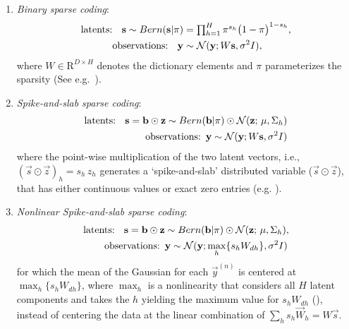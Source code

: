 \begin{enumerate}
\item \textit{Binary sparse coding}:
%
\vspace{-.1cm}
\begin{align}
\text{latents: } \,\,\,\vec{s} \sim Bern(\vec{s} | \pi) &= \disT\prod_{h=1}^H \pi^{s_h} \big( 1 - \pi \big)^{1-s_h},\nonumber \\
\text{observations:  }\,\,\,    \vec{y} &\sim \mathcal{N}(\vec{y}; W\vec{s}, \sigma^2\One),\nonumber%
\end{align}
%
where $W \in \mathrm{R}^{D \times H}$ denotes the dictionary elements and $\pi$ parameterizes the sparsity (See e.g.~\citep{HennigesEtAl2010}).
%
\item \textit{Spike-and-slab sparse coding}:
\vspace{-.2cm}
\begin{align}
\text{latents: } \,\,\,\vec{s} = \vec{b}\odot\vec{z} \sim Bern(\vec{b} | \pi) \odot \mathcal{N}(\vec{z};\,\vec{\mu} , \Sigma_h)\nonumber\\
\text{observations:}  \,\,\, \vec{y} \sim \mathcal{N}(\vec{y}; W\vec{s}, \sigma^2\One)\nonumber%
\end{align}
where the point-wise multiplication of the two latent vectors, i.e., $(\vec{s}\odot\vec{z})_h = s_h\,z_h$
generates a `spike-and-slab' distributed variable ($\vec{s}\odot\vec{z}$), that has either continuous values or exact zero entries (e.g. \citep{TitsiasGredilla2011,GoodfellowEtAl2013,SheikhEtAl2014}).
%
\item \textit{Nonlinear Spike-and-slab sparse coding}:
\vspace{-.2cm}
\begin{align}\label{eq:ssmca}
\text{latents: } \,\,\,{\mathbf{s}} = {\mathbf{b}}\odot{\mathbf{z}} &\sim Bern({\mathbf{b}} | \pi) \odot \mathcal{N}({\mathbf{z}};\,{\mathbf{\mu}} , \Sigma_h), \nonumber\\
 \text{observations:}\,\,\, &{\mathbf{y}} \sim \mathcal{N}({\mathbf{y}}; \max_{h}\{s_hW_{dh}\}, \sigma^2I)\nonumber
\end{align}
for which the mean of the Gaussian for each $\vec{y}^{(n)}$ is centered at $\max_{h}\{s_hW_{dh}\}$, where $\max_{h}$ is a nonlinearity that considers all $H$ latent components and takes the $h$ yielding the maximum value for $s_hW_{dh}$ (\citep{LuckeSahani2008,SheltonEtAl2012,BornscheinEtAl2013}), instead of centering the data at the linear combination of $\sum_h s_h\vec{W}_h=W\vec{s}$.
%
\end{enumerate}

